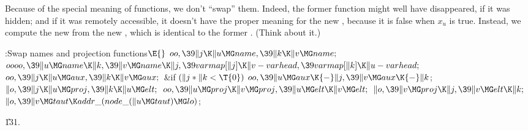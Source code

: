 Because of the special meaning of  functions, we don't ``swap''
them. Indeed, the former function  might well have
disappeared,
if it was hidden; and if it was remotely accessible, it doesn't have
the proper meaning for the new , because it is false when
$x_u$ is true. Instead, we compute the new  from the
new , which is identical to the former . (Think about it.)

\Y\B\4:Swap names and projection functions\X${}\E{}$\6
$\\{oo},\39\|j\K\|u\MG\\{name},\39\|k\K\|v\MG\\{name};{}$\6
${}\\{oooo},\39\|u\MG\\{name}\K\|k,\39\|v\MG\\{name}\K\|j,\39\\{varmap}[\|j]\K%
\|v-\\{varhead},\39\\{varmap}[\|k]\K\|u-\\{varhead};{}$\6
${}\\{oo},\39\|j\K\|u\MG\\{aux},\39\|k\K\|v\MG\\{aux};{}$\6
\&{if} ${}(\|j*\|k<\T{0}){}$\1\5
${}\\{oo},\39\|u\MG\\{aux}\K{-}\|j,\39\|v\MG\\{aux}\K{-}\|k{}$;\2\6
${}\|o,\39\|j\K\|u\MG\\{proj},\39\|k\K\|u\MG\\{elt};{}$\6
${}\\{oo},\39\|u\MG\\{proj}\K\|v\MG\\{proj},\39\|u\MG\\{elt}\K\|v\MG\\{elt};{}$%
\6
${}\|o,\39\|v\MG\\{proj}\K\|j,\39\|v\MG\\{elt}\K\|k;{}$\6
${}\|o,\39\|v\MG\\{taut}\K\\{addr\_}(\\{node\_}(\|u\MG\\{taut})\MG\\{lo}){}$;%
\par
\U131.\fi

